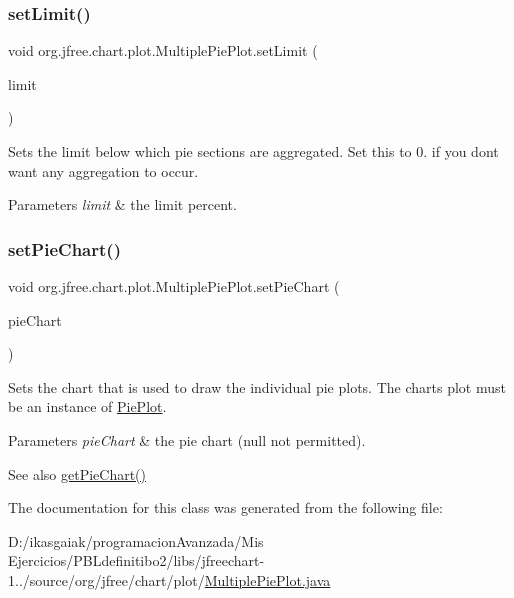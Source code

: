 \subsubsection{\texorpdfstring{set\+Limit()}{setLimit()}}
{\footnotesize\ttfamily void org.\+jfree.\+chart.\+plot.\+Multiple\+Pie\+Plot.\+set\+Limit (\begin{DoxyParamCaption}\item[{double}]{limit }\end{DoxyParamCaption})}

Sets the limit below which pie sections are aggregated. Set this to 0. if you don\textquotesingle{}t want any aggregation to occur.


\begin{DoxyParams}{Parameters}
{\em limit} & the limit percent. \\
\hline
\end{DoxyParams}
\mbox{\label{classorg_1_1jfree_1_1chart_1_1plot_1_1_multiple_pie_plot_a781207ab169b3063bbfab48cfa4c133d}} 
\subsubsection{\texorpdfstring{set\+Pie\+Chart()}{setPieChart()}}
{\footnotesize\ttfamily void org.\+jfree.\+chart.\+plot.\+Multiple\+Pie\+Plot.\+set\+Pie\+Chart (\begin{DoxyParamCaption}\item[{\mbox{\hyperlink{classorg_1_1jfree_1_1chart_1_1_j_free_chart}{J\+Free\+Chart}}}]{pie\+Chart }\end{DoxyParamCaption})}

Sets the chart that is used to draw the individual pie plots. The chart\textquotesingle{}s plot must be an instance of \mbox{\hyperlink{classorg_1_1jfree_1_1chart_1_1plot_1_1_pie_plot}{Pie\+Plot}}.


\begin{DoxyParams}{Parameters}
{\em pie\+Chart} & the pie chart ({\ttfamily null} not permitted).\\
\hline
\end{DoxyParams}
\begin{DoxySeeAlso}{See also}
\mbox{\hyperlink{classorg_1_1jfree_1_1chart_1_1plot_1_1_multiple_pie_plot_ab8664cb990f572f73346eba4053741b0}{get\+Pie\+Chart()}} 
\end{DoxySeeAlso}


The documentation for this class was generated from the following file\+:\begin{DoxyCompactItemize}
\item 
D\+:/ikasgaiak/programacion\+Avanzada/\+Mis Ejercicios/\+P\+B\+Ldefinitibo2/libs/jfreechart-\/1../source/org/jfree/chart/plot/\mbox{\hyperlink{_multiple_pie_plot_8java}{Multiple\+Pie\+Plot.\+java}}\end{DoxyCompactItemize}
